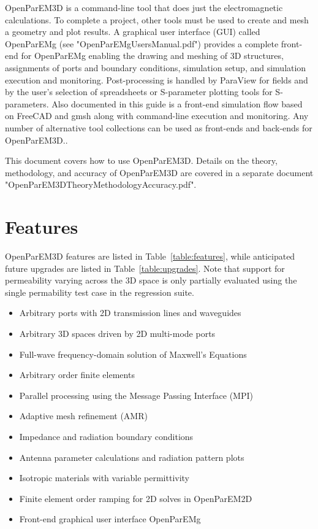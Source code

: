 \documentclass[titlepage]{article}
\renewcommand\_{\textunderscore\linebreak[1]}
\begin{document}
OpenParEM3D is a command-line tool that does just the electromagnetic calculations.  To complete a project, other tools must be used to create and mesh a geometry and plot results.  A graphical user interface (GUI) called OpenParEMg (see "OpenParEMg\_Users\_Manual.pdf") provides a complete front-end for OpenParEMg enabling the drawing and meshing of 3D structures, assignments of ports and boundary conditions, simulation setup, and simulation execution and monitoring.  Post-processing is handled by ParaView \cite{ParaView} for fields and by the user's selection of spreadsheets or S-parameter plotting tools for S-parameters.  Also documented in this guide is a front-end simulation flow based on FreeCAD \cite{FreeCAD} and gmsh \cite{gmsh}\cite{gmshweb} along with command-line execution and monitoring.  Any number of alternative tool collections can be used as front-ends and back-ends for OpenParEM3D..

This document covers how to use OpenParEM3D.  Details on the theory, methodology, and accuracy of OpenParEM3D are covered in a separate document "OpenParEM3D\_Theory\_Methodology\_Accuracy.pdf".

\section{Features}

OpenParEM3D features are listed in Table~\ref{table:features}, while anticipated future upgrades are listed in Table~\ref{table:upgrades}. Note that support for permeability varying across the 3D space is only partially evaluated using the single permability test case in the regression suite.

\begin{table}[ht]
\caption{OpenParEM3D List of Features}
\noindent \hrulefill
\begin{itemize}[nosep]
  \item Arbitrary ports with 2D transmission lines and waveguides
  \item Arbitrary 3D spaces driven by 2D multi-mode ports
  \item Full-wave frequency-domain solution of Maxwell's Equations
  \item Arbitrary order finite elements
  \item Parallel processing using the Message Passing Interface (MPI)
  \item Adaptive mesh refinement (AMR)
  \item Impedance and radiation boundary conditions
  \item Antenna parameter calculations and radiation pattern plots
  \item Isotropic materials with variable permittivity
  \item Finite element order ramping for 2D solves in OpenParEM2D
  \item Front-end graphical user interface OpenParEMg
\end{itemize}
\noindent \hrulefill
\label{table:features}
\end{table}
\end{document}
